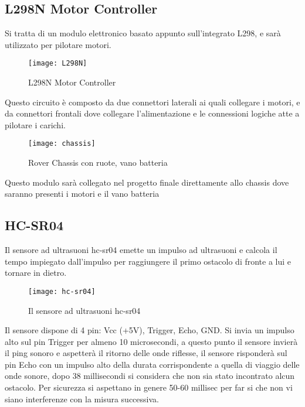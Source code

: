 \subsection{L298N Motor Controller}
Si tratta di un modulo elettronico basato appunto sull’integrato L298, e sarà utilizzato per pilotare motori.
\begin{figure}[htbp!] 
	\centering    
	\texttt{[image: L298N]}
	\caption[L298N Motor Controller]{L298N Motor Controller}
	\label{fig:L298N}
\end{figure}
Questo circuito è composto da due connettori laterali ai quali collegare i motori, e da connettori frontali dove collegare l’alimentazione e le connessioni logiche atte a pilotare i carichi.
\begin{figure}[htbp!] 
	\centering    
	\texttt{[image: chassis]}
	\caption[Rover Chassis]{Rover Chassis con ruote, vano batteria}
	\label{fig:chassis}
\end{figure}
Questo modulo sarà collegato nel progetto finale direttamente allo chassis dove saranno presenti i motori e il vano batteria


\subsection{HC-SR04}
Il  sensore ad ultrasuoni hc-sr04 emette un impulso ad ultrasuoni e calcola il tempo impiegato dall’impulso per raggiungere il primo ostacolo di fronte a lui e tornare in dietro.
\begin{figure}[htbp!] 
	\centering    
	\texttt{[image: hc-sr04]}
	\caption[HC-SR04]{Il sensore ad ultrasuoni hc-sr04}
	\label{fig:hc-sr04}
\end{figure}
Il sensore dispone di 4 pin: Vcc (+5V), Trigger, Echo, GND. Si invia un impulso alto sul pin Trigger per almeno 10 microsecondi, a questo punto il sensore invierà il ping sonoro e aspetterà il ritorno delle onde riflesse, il sensore risponderà sul pin Echo con un impulso alto della durata corrispondente a quella di viaggio delle onde sonore, dopo 38 millisecondi si considera che non sia stato incontrato alcun ostacolo. Per sicurezza si aspettano in genere 50-60 millisec per far si che non vi siano interferenze con la misura successiva.


